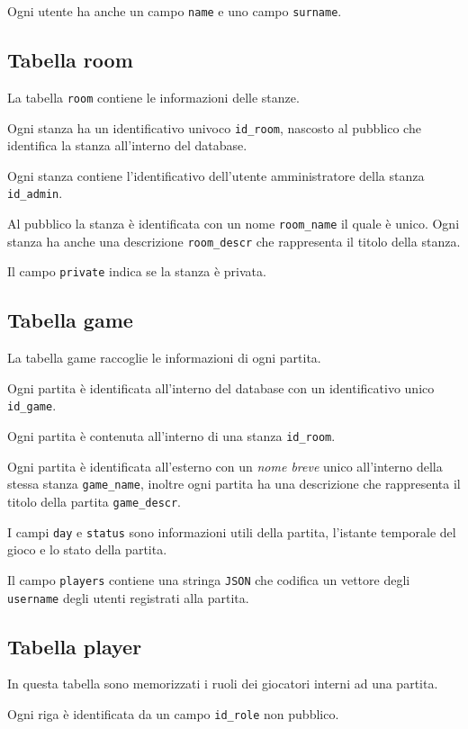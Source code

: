 \documentclass[10pt,a4paper]{article}
\begin{document}
Ogni utente ha anche un campo \texttt{name} e uno campo \texttt{surname}.

\subsection{Tabella room}
La tabella \texttt{room} contiene le informazioni delle stanze. 

Ogni stanza ha un identificativo univoco \texttt{id\_room}, nascosto al pubblico che identifica la stanza all'interno del database. 

Ogni stanza contiene l'identificativo dell'utente amministratore della stanza \texttt{id\_admin}. 

Al pubblico la stanza è identificata con un nome \texttt{room\_name} il quale è unico. Ogni stanza ha anche una descrizione \texttt{room\_descr} che rappresenta il titolo della stanza. 

Il campo \texttt{private} indica se la stanza è privata.

\subsection{Tabella game}
La tabella game raccoglie le informazioni di ogni partita. 

Ogni partita è identificata all'interno del database con un identificativo unico \texttt{id\_game}. 

Ogni partita è contenuta all'interno di una stanza \texttt{id\_room}. 

Ogni partita è identificata all'esterno con un \emph{nome breve} unico all'interno della stessa stanza \texttt{game\_name}, inoltre ogni partita ha una descrizione che rappresenta il titolo della partita \texttt{game\_descr}.

I campi \texttt{day} e \texttt{status} sono informazioni utili della partita, l'istante temporale del gioco e lo stato della partita.

Il campo \texttt{players} contiene una stringa \texttt{JSON} che codifica un vettore degli \texttt{username} degli utenti registrati alla partita.

\subsection{Tabella player}
In questa tabella sono memorizzati i ruoli dei giocatori interni ad una partita. 

Ogni riga è identificata da un campo \texttt{id\_role} non pubblico. 
\end{document}

